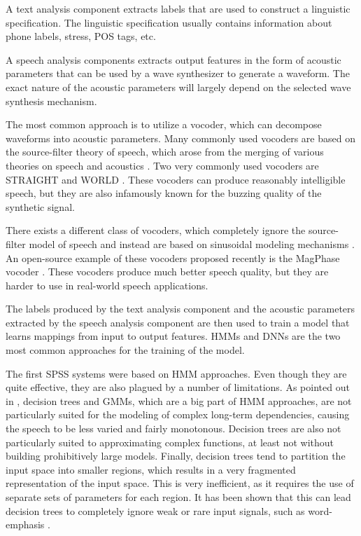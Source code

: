A text analysis component extracts labels that are used to construct a linguistic specification.
The linguistic specification usually contains information about phone labels, stress, \ac{POS} tags, etc.

A speech analysis components extracts output features in the form of acoustic parameters that can be used by a wave synthesizer to generate a waveform.
The exact nature of the acoustic parameters will largely depend on the selected wave synthesis mechanism.

The most common approach is to utilize a vocoder, which can decompose waveforms into acoustic parameters.
Many commonly used vocoders are based on the source-filter theory of speech, which arose from the merging of various theories on speech and acoustics \citep{Chiba1941vowel, Fant1960Acoustic}.
Two very commonly used vocoders are STRAIGHT \citep{Kawahara1999Restructuring} and WORLD \citep{Morise2016WORLD}.
These vocoders can produce reasonably intelligible speech, but they are also infamously known for the buzzing quality of the synthetic signal.

There exists a different class of vocoders, which completely ignore the source-filter model of speech and instead are based on sinusoidal modeling mechanisms \citep{McAulay1986Speech}.
An open-source example of these vocoders proposed recently is the MagPhase vocoder \citep{Espic2017Direct}.
These vocoders produce much better speech quality, but they are harder to use in real-world speech applications.

The labels produced by the text analysis component and the acoustic parameters extracted by the speech analysis component are then used to train a model that learns mappings from input to output features.
\acp{HMM} and \acp{DNN} are the two most common approaches for the training of the model.

The first \ac{SPSS} systems were based on \ac{HMM} approaches.
Even though they are quite effective, they are also plagued by a number of limitations.
As pointed out in \citet{Zen2013Statistical}, decision trees and \acp{GMM}, which are a big part of \ac{HMM} approaches, are not particularly suited for the modeling of complex long-term dependencies, causing the speech to be less varied and fairly monotonous.
Decision trees are also not particularly suited to approximating complex functions, at least not without building prohibitively large models.
Finally, decision trees tend to partition the input space into smaller regions, which results in a very fragmented representation of the input space.
This is very inefficient, as it requires the use of separate sets of parameters for each region.
It has been shown that this can lead decision trees to completely ignore weak or rare input signals, such as word-emphasis \citep{Yu2010Word}.

